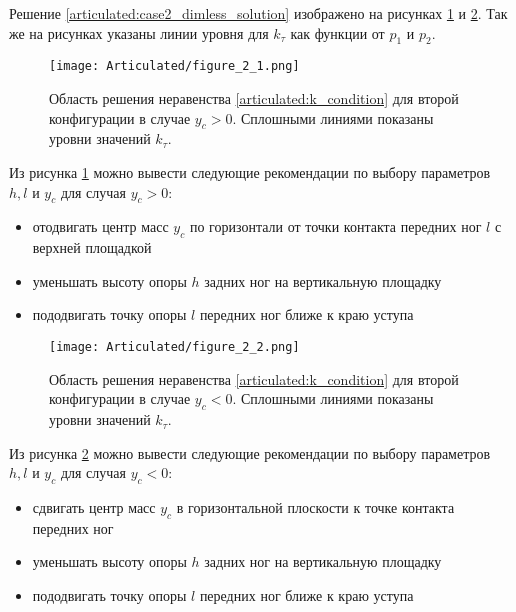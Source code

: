 Решение \ref{articulated:case2_dimless_solution} изображено на рисунках \ref{articulated:fig:case2_dimless_solution_1} и \ref{articulated:fig:case2_dimless_solution_2}. Так же на рисунках указаны линии уровня для $k_\tau$ как функции от $p_1$ и $p_2$.

\begin{figure}[ht]
  \centering
  \texttt{[image: Articulated/figure\_2\_1.png]}
  \caption{Область решения неравенства \ref{articulated:k_condition} для второй конфигурации в случае $y_c > 0$. Сплошными линиями показаны уровни значений $k_\tau$.}
  \label{articulated:fig:case2_dimless_solution_1}
\end{figure}

Из рисунка \ref{articulated:fig:case2_dimless_solution_1} можно вывести следующие рекомендации по выбору параметров $h,l$ и $y_c$ для случая $y_c > 0$:

\begin{itemize}
  \item отодвигать центр масс $y_c$ по горизонтали от точки контакта передних ног $l$ с верхней площадкой
  \item уменьшать высоту опоры $h$ задних ног на вертикальную площадку
  \item пододвигать точку опоры $l$ передних ног ближе к краю уступа
\end{itemize}

\begin{figure}[ht]
  \centering
  \texttt{[image: Articulated/figure\_2\_2.png]}
  \caption{Область решения неравенства \ref{articulated:k_condition} для второй конфигурации в случае $y_c < 0$. Сплошными линиями показаны уровни значений $k_\tau$.}
  \label{articulated:fig:case2_dimless_solution_2}
\end{figure}

Из рисунка \ref{articulated:fig:case2_dimless_solution_2} можно вывести следующие рекомендации по выбору параметров $h,l$ и $y_c$ для случая $y_c < 0$:

\begin{itemize}
  \item сдвигать центр масс $y_c$ в горизонтальной плоскости к точке контакта передних ног
  \item уменьшать высоту опоры $h$ задних ног на вертикальную площадку
  \item пододвигать точку опоры $l$ передних ног ближе к краю уступа
\end{itemize}

